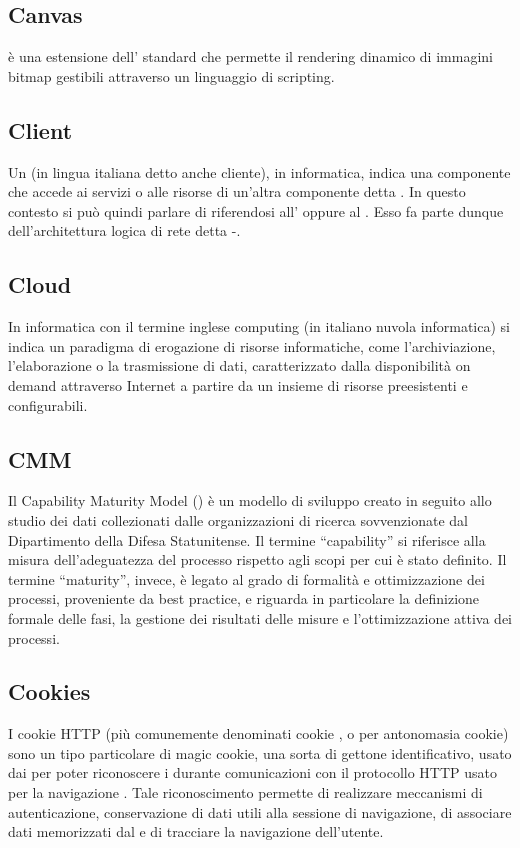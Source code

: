\subsection{Canvas}
 è una estensione dell' standard che permette il rendering dinamico di immagini bitmap gestibili attraverso un linguaggio di scripting.

\subsection{Client}
Un  (in lingua italiana detto anche cliente), in informatica, indica una componente che accede ai servizi o alle risorse di un'altra componente detta . In questo contesto si può quindi parlare di  riferendosi all' oppure al . Esso fa parte dunque dell'architettura logica di rete detta -.

\subsection{Cloud}
In informatica con il termine inglese  computing (in italiano nuvola informatica) si indica un paradigma di erogazione di risorse informatiche, come l'archiviazione, l'elaborazione o la trasmissione di dati, caratterizzato dalla disponibilità on demand attraverso Internet a partire da un insieme di risorse preesistenti e configurabili.

\subsection{CMM}
Il Capability Maturity Model () è un modello di sviluppo creato in seguito allo
studio dei dati collezionati dalle organizzazioni di ricerca sovvenzionate dal Dipartimento
della Difesa Statunitense. Il termine “capability” si riferisce alla misura dell’adeguatezza
del processo rispetto agli scopi per cui è stato definito. Il termine “maturity”, invece, è
legato al grado di formalità e ottimizzazione dei processi, proveniente da best practice, e
riguarda in particolare la definizione formale delle fasi, la gestione dei risultati delle misure
e l’ottimizzazione attiva dei processi.

\subsection{Cookies}
I cookie HTTP (più comunemente denominati cookie , o per antonomasia cookie) sono un tipo particolare di magic cookie, una sorta di gettone identificativo, usato dai   per poter riconoscere i  durante comunicazioni con il protocollo HTTP usato per la navigazione . Tale riconoscimento permette di realizzare meccanismi di autenticazione, conservazione di dati utili alla sessione di navigazione, di associare dati memorizzati dal  e di tracciare la navigazione dell'utente.

